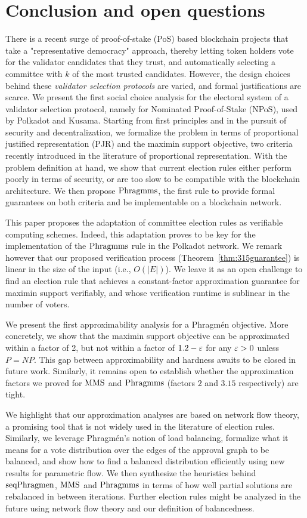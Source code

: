 \section{Conclusion and open questions}\label{s:conc}

There is a recent surge of proof-of-stake (PoS) based blockchain projects that take a "representative democracy" approach, thereby letting token holders vote for the validator candidates that they trust, and automatically selecting a committee with $k$ of the most trusted candidates. However, the design choices behind these \emph{validator selection protocols} are varied, and formal justifications are scarce. 
%
We present the first social choice analysis for the electoral system of a validator selection protocol, namely for Nominated Proof-of-Stake (NPoS), used by Polkadot and Kusama. 
%
Starting from first principles and in the pursuit of security and decentralization, we formalize the problem in terms of proportional justified representation (PJR) and the maximin support objective, two criteria recently introduced in the literature of proportional representation.
With the problem definition at hand, we show that current election rules either perform poorly in terms of security, or are too slow to be compatible with the blockchain architecture. We then propose $\operatorname{Phragmms}$, the first rule to provide formal guarantees on both criteria and be implementable on a blockchain network. 

This paper proposes the adaptation of committee election rules as verifiable computing schemes. Indeed, this adaptation proves to be key for the implementation of the $\operatorname{Phragmms}$ rule in the Polkadot network.
%
We remark however that our proposed verification process (Theorem~\ref{thm:315guarantee}) is linear in the size of the input (i.e., $O(|E|)$). We leave it as an open challenge to find an election rule that achieves a constant-factor approximation guarantee for maximin support verifiably, and whose verification runtime is sublinear in the number of voters.

We present the first approximability analysis for a Phragm\'{e}n objective. More concretely, we show that the maximin support objective can be approximated within a factor of 2, but not within a factor of $1.2-\varepsilon$ for any $\varepsilon>0$ unless $P=NP$. This gap between approximability and hardness awaits to be closed in future work. 
Similarly, it remains open to establish whether the approximation factors we proved for $\operatorname{MMS}$ and $\operatorname{Phragmms}$ (factors $2$ and $3.15$ respectively) are tight.

We highlight that our approximation analyses are based on network flow theory, a promising tool that is not widely used in the literature of election rules. 
Similarly, we leverage Phragm\'{e}n's notion of load balancing, formalize what it means for a vote distribution over the edges of the approval graph to be balanced, and show how to find a balanced distribution efficiently using new results for parametric flow. We then synthesize the heuristics behind $\operatorname{seqPhragmen}$, $\operatorname{MMS}$ and $\operatorname{Phragmms}$ in terms of how well partial solutions are rebalanced in between iterations. 
Further election rules might be analyzed in the future using network flow theory and our definition of balancedness. 


